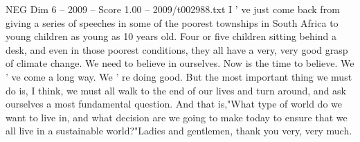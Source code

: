 \begin{textsample}{NEG Dim 6 – 2009 – Score 1.00 – 2009/t002988.txt}
I ' ve just come back from giving a series of speeches in some of the poorest townships in South Africa to young children as young as 10 years old.
Four or five children sitting behind a desk, and even in those poorest conditions, they all have a very, very good grasp of climate change.
We need to believe in ourselves.
Now is the time to believe.
We ' ve come a long way.
We ' re doing good.
But the most important thing we must do is, I think, we must all walk to the end of our lives and turn around, and ask ourselves a most fundamental question.
And that is,"What type of world do we want to live in, and what decision are we going to make today to ensure that we all live in a sustainable world?"Ladies and gentlemen, thank you very, very much.

\end{textsample}

